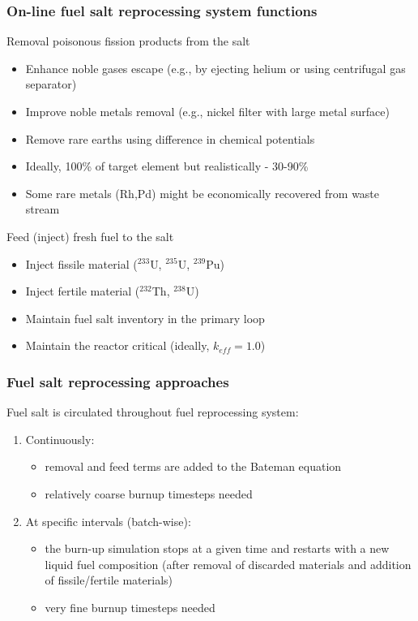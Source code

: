\begin{frame}
\frametitle{On-line fuel salt reprocessing system functions}
\begin{block}{Removal poisonous fission products from the salt}
	\begin{itemize}
		\item Enhance noble gases escape (e.g., by ejecting helium or using centrifugal gas separator)
		\item Improve noble metals removal (e.g., nickel filter with large metal surface)
		\item Remove rare earths using difference in chemical potentials
		\item Ideally, 100\% of target element but realistically - 30-90\%
		\item Some rare metals (Rh,Pd) might be economically recovered from waste stream %
	\end{itemize}
\end{block}

\begin{block}{Feed (inject) fresh fuel to the salt}
	\begin{itemize}
		\item Inject fissile material ($^{233}$U, $^{235}$U, $^{239}$Pu)
		\item Inject fertile material ($^{232}$Th, $^{238}$U)
		\item Maintain fuel salt inventory in the primary loop
		\item Maintain the reactor critical (ideally, $k_{eff}=1.0$)
	\end{itemize}
\end{block}

\end{frame}


\begin{frame}
\frametitle{Fuel salt reprocessing approaches}

Fuel salt is circulated throughout fuel reprocessing system:
\\
\begin{enumerate}
	\itemsep2em
	\item Continuously:
	\begin{itemize}
		\item removal and feed terms are added to the Bateman equation
		\item relatively coarse burnup timesteps needed
	\end{itemize}
	\item At specific intervals (batch-wise): 
	\begin{itemize}
		\item the
burn-up simulation stops at a given time and restarts with a new
liquid fuel composition (after removal of discarded materials and
		addition of fissile/fertile materials)
		\item very fine burnup timesteps needed
	\end{itemize}
\end{enumerate}


\end{frame}


